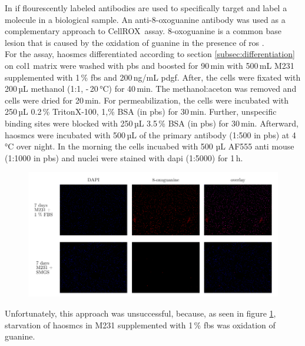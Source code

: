 In \ac{if} flourescently labeled antibodies are used to specifically target and label a molecule in a biological sample. An anti-8-oxoguanine antibody was used as a complementary approach to CellROX\texttrademark~assay. 8-oxoguanine is a common base lesion that is caused by the oxidation of guanine in the presence of \ac{ros} \cite{leon8OxoguanineAccumulationMitochondrial2016}.\\
For the assay, \acp{haosmc} differentiated according to section \ref{subsec:differentiation} on \ac{col1} matrix were washed with \ac{pbs} and boosted for 90\,min with 500\,mL \ac{M231} supplemented with 1\,\% \ac{fbs} and 200\,ng/mL \ac{pdgf}. After, the cells were fixated with 200\,µL methanol (1:1, -\,20\,°C) for 40\,min. The methanol:aceton was removed and cells were dried for 20\,min. For permeabilization, the cells were incubated with 250\,µL 0.2\,\% Triton\textregistered X-100, 1,\% BSA (in \ac{pbs}) for 30\,min. Further, unspecific binding sites were blocked with 250\,µL 3.5\,\% BSA (in \ac{pbs}) for 30\,min. Afterward, \acp{haosmc} were incubated with 500\,µL of the primary antibody (1:500 in \ac{pbs}) at 4\,°C over night. In the morning the cells incuabed with 500 µL AF555 anti mouse (1:1000 in \ac{pbs}) and nuclei were stained with \acf{dapi} (1:5000) for 1\,h.

\begin{figure}[H]
    \capstart
    \centering
    \includegraphics{Abbildung/8oxoG.pdf}

    \begin{minipage}{\captionwidth}
        \caption[antibody]{\newline
        }
        \label{fig:antibody}
    \end{minipage}
\end{figure}

Unfortunately, this approach was unsuccessful, because, as seen in figure \ref{fig:antibody}, starvation of \acp{haosmc} in \ac{M231} supplemented with 1\,\% \ac{fbs} was oxidation of guanine.

